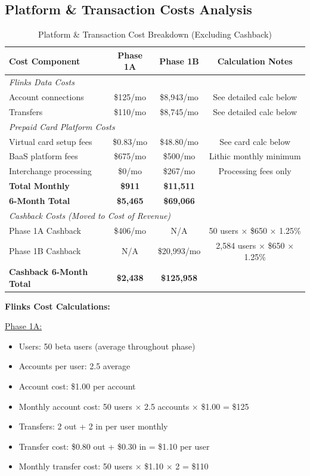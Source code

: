 \documentclass[11pt,letterpaper]{article}
\begin{document}
\newpage

\subsection{Platform \& Transaction Costs Analysis}

\begin{table}[h]
\centering
\caption{Platform \& Transaction Cost Breakdown (Excluding Cashback)}
\begin{tabular}{|l|c|c|c|}
\hline
\textbf{Cost Component} & \textbf{Phase 1A} & \textbf{Phase 1B} & \textbf{Calculation Notes} \\
\hline
\multicolumn{4}{|l|}{\textit{Flinks Data Costs}} \\
\hline
Account connections        & \$125/mo    & \$8,943/mo  & See detailed calc below \\
Transfers                  & \$110/mo    & \$8,745/mo  & See detailed calc below \\
\hline
\multicolumn{4}{|l|}{\textit{Prepaid Card Platform Costs}} \\
\hline
Virtual card setup fees    & \$0.83/mo   & \$48.80/mo  & See card calc below \\
BaaS platform fees         & \$675/mo    & \$500/mo    & Lithic monthly minimum \\
Interchange processing     & \$0/mo      & \$267/mo    & Processing fees only \\
\hline
\textbf{Total Monthly}     & \textbf{\$911}    & \textbf{\$11,511}   & \\
\textbf{6-Month Total}     & \textbf{\$5,465}  & \textbf{\$69,066}  & \\
\hline
\multicolumn{4}{|l|}{\textit{Cashback Costs (Moved to Cost of Revenue)}} \\
\hline
Phase 1A Cashback         & \$406/mo    & N/A         & 50 users × \$650 × 1.25\% \\
Phase 1B Cashback         & N/A         & \$20,993/mo & 2,584 users × \$650 × 1.25\% \\
\textbf{Cashback 6-Month Total} & \textbf{\$2,438} & \textbf{\$125,958} & \\
\hline
\end{tabular}
\end{table}

\textbf{Flinks Cost Calculations:}

\underline{Phase 1A:}
\begin{itemize}
\item Users: 50 beta users (average throughout phase)
\item Accounts per user: 2.5 average
\item Account cost: \$1.00 per account
\item Monthly account cost: 50 users × 2.5 accounts × \$1.00 = \$125
\item Transfers: 2 out + 2 in per user monthly
\item Transfer cost: \$0.80 out + \$0.30 in = \$1.10 per user
\item Monthly transfer cost: 50 users × \$1.10 × 2 = \$110
\end{itemize}
\end{document}
